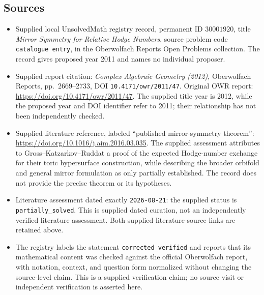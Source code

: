 \documentclass[11pt]{article}
\begin{document}
\subsection{Sources}
\begin{itemize}
\item Supplied local UnsolvedMath registry record, permanent ID \(30001920\), title \emph{Mirror Symmetry for Relative Hodge Numbers}, source problem code \texttt{catalogue entry}, in the Oberwolfach Reports Open Problems collection. The record gives proposed year 2011 and names no individual proposer.
\item Supplied report citation: \emph{Complex Algebraic Geometry (2012)}, Oberwolfach Reports, pp.~2669--2733, DOI \texttt{10.4171/owr/2011/47}. Original OWR report: \url{https://doi.org/10.4171/owr/2011/47}. The supplied title year is 2012, while the proposed year and DOI identifier refer to 2011; their relationship has not been independently checked.
\item Supplied literature reference, labeled ``published mirror-symmetry theorem'': \url{https://doi.org/10.1016/j.aim.2016.03.035}. The supplied assessment attributes to Gross--Katzarkov--Ruddat a proof of the expected Hodge-number exchange for their toric hypersurface construction, while describing the broader orbifold and general mirror formulation as only partially established. The record does not provide the precise theorem or its hypotheses.
\item Literature assessment dated exactly \texttt{2026-08-21}: the supplied status is \texttt{partially\_solved}. This is supplied dated curation, not an independently verified literature assessment. Both supplied literature-source links are retained above.
\item The registry labels the statement \texttt{corrected\_verified} and reports that its mathematical content was checked against the official Oberwolfach report, with notation, context, and question form normalized without changing the source-level claim. This is a supplied verification claim; no source visit or independent verification is asserted here.
\end{itemize}
\end{document}
